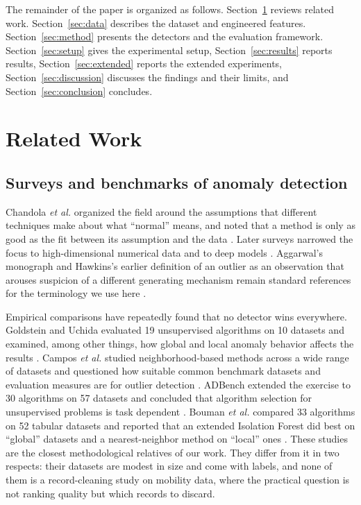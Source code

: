 \documentclass{ieeeaccess}
\begin{document}
The remainder of the paper is organized as follows. Section~\ref{sec:related} reviews related work. Section~\ref{sec:data} describes the dataset and engineered features. Section~\ref{sec:method} presents the detectors and the evaluation framework. Section~\ref{sec:setup} gives the experimental setup, Section~\ref{sec:results} reports results, Section~\ref{sec:extended} reports the extended experiments, Section~\ref{sec:discussion} discusses the findings and their limits, and Section~\ref{sec:conclusion} concludes.

\section{Related Work}
\label{sec:related}

\subsection{Surveys and benchmarks of anomaly detection}
Chandola \emph{et al.} organized the field around the assumptions that different techniques make about what ``normal'' means, and noted that a method is only as good as the fit between its assumption and the data \cite{chandola2009}. Later surveys narrowed the focus to high-dimensional numerical data \cite{zimek2012} and to deep models \cite{pang2021}. Aggarwal's monograph and Hawkins's earlier definition of an outlier as an observation that arouses suspicion of a different generating mechanism remain standard references for the terminology we use here \cite{hawkins1980,aggarwal2017}.

Empirical comparisons have repeatedly found that no detector wins everywhere. Goldstein and Uchida evaluated 19 unsupervised algorithms on 10 datasets and examined, among other things, how global and local anomaly behavior affects the results \cite{goldstein2016}. Campos \emph{et al.} studied neighborhood-based methods across a wide range of datasets and questioned how suitable common benchmark datasets and evaluation measures are for outlier detection \cite{campos2016}. ADBench extended the exercise to 30 algorithms on 57 datasets and concluded that algorithm selection for unsupervised problems is task dependent \cite{han2022}. Bouman \emph{et al.} compared 33 algorithms on 52 tabular datasets and reported that an extended Isolation Forest did best on ``global'' datasets and a nearest-neighbor method on ``local'' ones \cite{bouman2024}. These studies are the closest methodological relatives of our work. They differ from it in two respects: their datasets are modest in size and come with labels, and none of them is a record-cleaning study on mobility data, where the practical question is not ranking quality but which records to discard.
\end{document}
